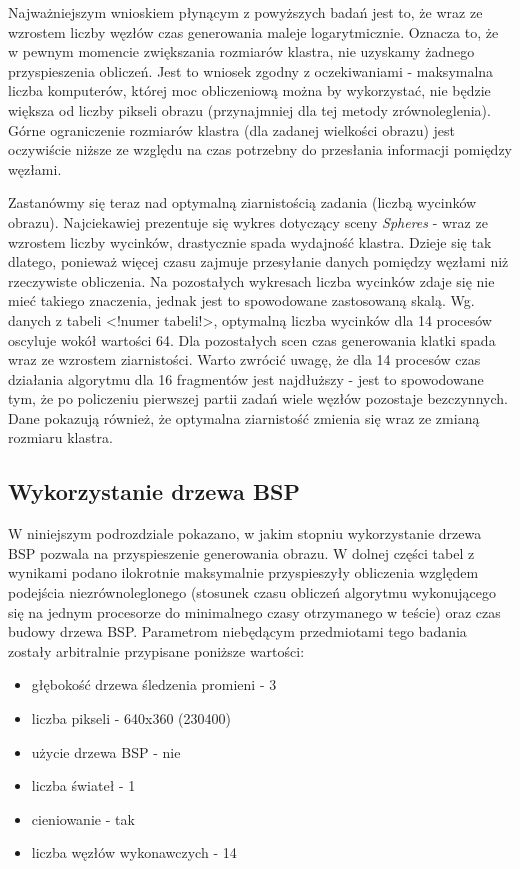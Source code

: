 Najważniejszym wnioskiem płynącym z powyższych badań jest to, że wraz ze wzrostem liczby węzłów czas generowania maleje logarytmicznie. Oznacza to, że w pewnym momencie zwiększania rozmiarów klastra, nie uzyskamy żadnego przyspieszenia obliczeń. Jest to wniosek zgodny z oczekiwaniami - maksymalna liczba komputerów, której moc obliczeniową można by wykorzystać, nie będzie większa od liczby pikseli obrazu (przynajmniej dla tej metody zrównoleglenia). Górne ograniczenie rozmiarów klastra (dla zadanej wielkości obrazu) jest oczywiście niższe ze względu na czas potrzebny do przesłania informacji pomiędzy węzłami.

Zastanówmy się teraz nad optymalną ziarnistością zadania (liczbą wycinków obrazu). Najciekawiej prezentuje się wykres dotyczący sceny \emph{Spheres} - wraz ze wzrostem liczby wycinków, drastycznie spada wydajność klastra. Dzieje się tak dlatego, ponieważ więcej czasu zajmuje przesyłanie danych pomiędzy węzłami niż rzeczywiste obliczenia. Na pozostałych wykresach liczba wycinków zdaje się nie mieć takiego znaczenia, jednak jest to spowodowane zastosowaną skalą. Wg. danych z tabeli <!numer tabeli!>, optymalną liczba wycinków dla 14 procesów oscyluje wokół wartości 64. Dla pozostałych scen czas generowania klatki spada wraz ze wzrostem ziarnistości. Warto zwrócić uwagę, że dla 14 procesów czas działania algorytmu dla 16 fragmentów jest najdłuższy - jest to spowodowane tym, że po policzeniu pierwszej partii zadań wiele węzłów pozostaje bezczynnych. Dane pokazują również, że optymalna ziarnistość zmienia się wraz ze zmianą rozmiaru klastra.

\subsection{Wykorzystanie drzewa BSP}

W niniejszym podrozdziale pokazano, w jakim stopniu wykorzystanie drzewa BSP pozwala na przyspieszenie generowania obrazu.  W dolnej części tabel z wynikami podano ilokrotnie maksymalnie przyspieszyły obliczenia względem podejścia niezrównoleglonego (stosunek czasu obliczeń algorytmu wykonującego się na jednym procesorze do minimalnego czasy otrzymanego w teście) oraz czas budowy drzewa BSP.
Parametrom niebędącym przedmiotami tego badania zostały arbitralnie przypisane poniższe wartości:

\begin{itemize}

\item głębokość drzewa śledzenia promieni - 3
\item liczba pikseli - 640x360 (230400)
\item użycie drzewa BSP - nie
\item liczba świateł - 1
\item cieniowanie - tak
\item liczba węzłów wykonawczych - 14 

\end{itemize}



